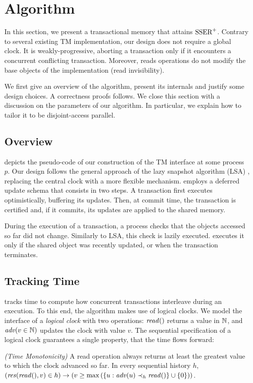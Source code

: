 \section{Algorithm}

In this section, we present a transactional memory that attains $\SPSER$.
Contrary to several existing TM implementation, our design does not require a global clock.
It is weakly-progressive, aborting a transaction only if it encounters a concurrent conflicting transaction.
Moreover, reads operations do not modify the base objects of the implementation (read invisibility).

We first give an overview of the algorithm, present its internals and justify some design choices.
A correctness proofs follows.
We close this section with a discussion on the parameters of our algorithm.
In particular, we explain how to tailor it to be disjoint-access parallel.

\subsection{Overview}

 depicts the pseudo-code of our construction of the TM interface at some process $p$.
Our design follows the general approach of the lazy snapshot algorithm (LSA) \cite{FelberFMR10}, replacing the central clock with a more flexible mechanism.
 employs a deferred update schema that consists in two steps.
A transaction first executes optimistically, buffering its updates.
Then, at commit time, the transaction is certified and, if it commits, its updates are applied to the shared memory.

During the execution of a transaction, a process checks that the objects accessed so far did not change.
Similarly to LSA, this check is lazily executed.
 executes it only if the shared object was recently updated, or when the transaction terminates.

\subsection{Tracking Time}

 tracks time to compute how concurrent transactions interleave during an execution.
To this end, the algorithm makes use of logical clocks.
We model the interface of a \emph{logical clock} with two operations: $\cread$ returns a value in $\naturalSet$, and $\cadv(v \in \naturalSet)$ updates the clock with value $v$.
The sequential specification of a logical clock guarantees a single property, that the time flows forward:
\begin{inparaenum}
\item[\emph{(Time Monotonicity)}]
  A read operation always returns at least the greatest value to which the clock advanced so far.
  In every sequential history $h$, $(\responseAny{\cread}{v} \in h) \implies (v \geq \max{(\{u : \cadv(u) \hb_h \cread \} \union \{0\})})$.
\end{inparaenum}

